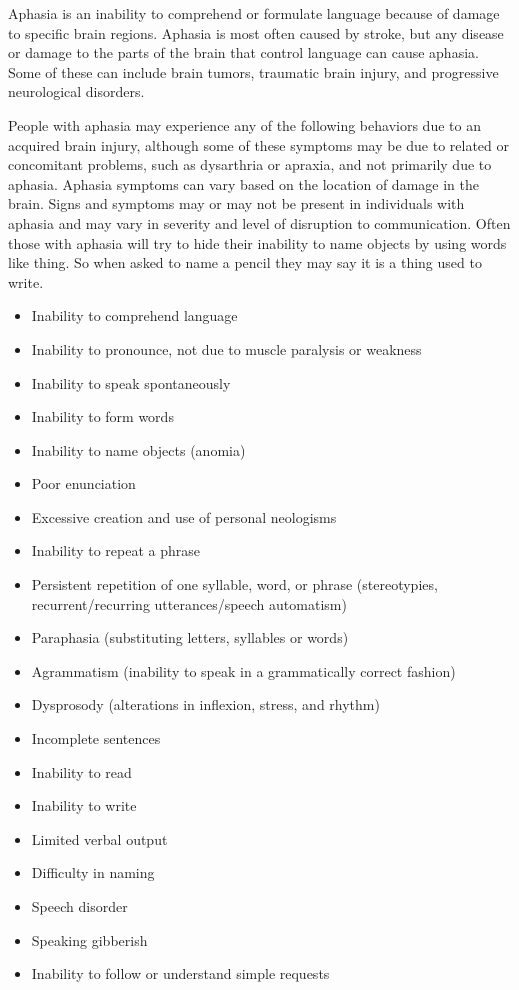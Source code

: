Aphasia is an inability to comprehend or formulate language because of
damage to specific brain regions. Aphasia is most often caused by
stroke, but any disease or damage to the parts of the brain that control
language can cause aphasia. Some of these can include brain tumors,
traumatic brain injury, and progressive neurological disorders.

People with aphasia may experience any of the following behaviors due to
an acquired brain injury, although some of these symptoms may be due to
related or concomitant problems, such as dysarthria or apraxia, and not
primarily due to aphasia. Aphasia symptoms can vary based on the
location of damage in the brain. Signs and symptoms may or may not be
present in individuals with aphasia and may vary in severity and level
of disruption to communication. Often those with aphasia will try to
hide their inability to name objects by using words like thing. So when
asked to name a pencil they may say it is a thing used to write.

\begin{itemize}
\item
  Inability to comprehend language
\item
  Inability to pronounce, not due to muscle paralysis or weakness
\item
  Inability to speak spontaneously
\item
  Inability to form words
\item
  Inability to name objects (anomia)
\item
  Poor enunciation
\item
  Excessive creation and use of personal neologisms
\item
  Inability to repeat a phrase
\item
  Persistent repetition of one syllable, word, or phrase (stereotypies,
  recurrent/recurring utterances/speech automatism)
\item
  Paraphasia (substituting letters, syllables or words)
\item
  Agrammatism (inability to speak in a grammatically correct fashion)
\item
  Dysprosody (alterations in inflexion, stress, and rhythm)
\item
  Incomplete sentences
\item
  Inability to read
\item
  Inability to write
\item
  Limited verbal output
\item
  Difficulty in naming
\item
  Speech disorder
\item
  Speaking gibberish
\item
  Inability to follow or understand simple requests
\end{itemize}

